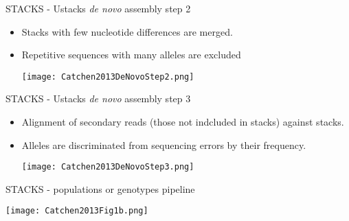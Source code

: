 \documentclass[presentation]{beamer}
\begin{document}
\begin{frame}[label={sec:org3f10ab2}]{STACKS - Ustacks \emph{de novo} assembly step 2}
\begin{itemize}
\item Stacks with few nucleotide differences are merged.
\item Repetitive sequences with many alleles are excluded
\begin{latex}
\begin{center}
\end{latex}
\begin{center}
\texttt{[image: Catchen2013DeNovoStep2.png]}
\end{center}

\end{itemize}
\end{frame}


\begin{frame}[label={sec:orgd916bbb}]{STACKS - Ustacks \emph{de novo} assembly step 3}
\begin{itemize}
\item Alignment of secondary reads (those not indcluded in stacks) against
stacks.
\item Alleles are discriminated from sequencing errors by their frequency.
\begin{latex}
\begin{center}
\end{latex}
\begin{center}
\texttt{[image: Catchen2013DeNovoStep3.png]}
\end{center}

\end{itemize}
\end{frame}

\begin{frame}[label={sec:org5238394}]{STACKS - populations or genotypes pipeline}
\begin{latex}
\begin{center}
\end{latex}
\begin{center}
\texttt{[image: Catchen2013Fig1b.png]}
\end{center}

\end{frame}
\end{document}
